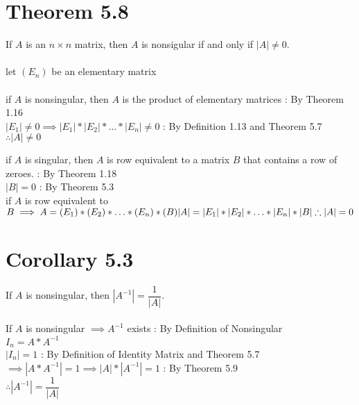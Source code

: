 \documentclass{report}
\begin{document}
\section*{Theorem 5.8}
If $A$ is an $n \times n$ matrix, then $A$ is nonsigular if and only if $|A| \neq 0$.
\\
\\
let $(E_n)$ be an elementary matrix
\\
\\
if $A$ is nonsingular, then $A$ is the product of elementary matrices : By Theorem 1.16
\\
$
|E_1| \neq 0 \implies |E_1|*|E_2|*\hdots*|E_n| \neq 0$ : By 
Definition 1.13 and Theorem  5.7
\\ $
\therefore |A| \neq 0
$ 
\begin{center}
\end{center}
if $A$ is singular, then $A$ is row equivalent to a matrix $B$ that contains a row of zeroes. : By Theorem 1.18\\
$|B| = 0 $ : By Theorem 5.3\\
if $A$ is row equivalent to $B \implies A=(E_1)*(E_2)*\hdots*(E_n)*(B)\\
|A| = |E_1|*|E_2|*\hdots*|E_n|*|B|
\\
\therefore |A|=0
$
 
 
\pagebreak
\section*{Corollary 5.3}
If $A$ is nonsingular, then $|A^{-1}|= \dfrac{1}{|A|}$.\\
\\
If $A$ is nonsingular $\implies A^{-1} $ exists : By Definition of Nonsingular\\
$I_n =A*A^{-1}$\\
$|I_n| = 1 $ : By Definition of Identity Matrix and Theorem 5.7\\
$\implies |A*A^{-1}|=1\implies|A|*|A^{-1}|=1$ : By Theorem 5.9\\
$\therefore |A^{-1}|= \dfrac{1}{|A|}$
\end{document}
